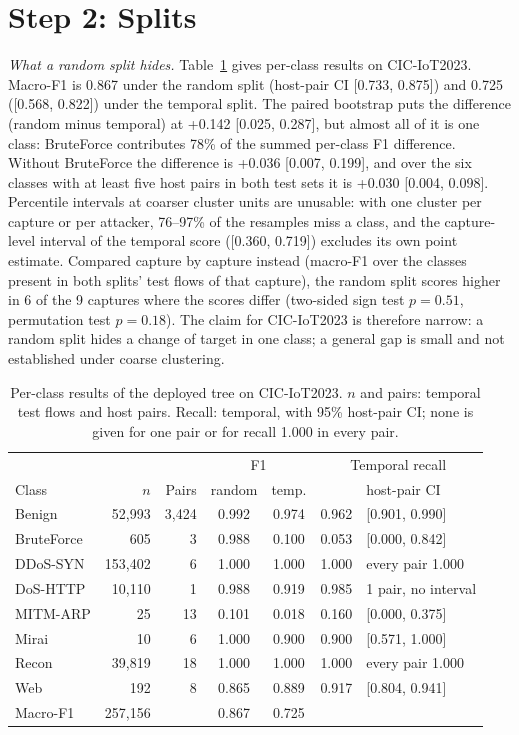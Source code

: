 \section{Step 2: Splits}\label{sec:splits}

\emph{What a random split hides.} Table~\ref{tab:perclass} gives per-class results on CIC-IoT2023. Macro-F1 is 0.867 under the random split (host-pair CI [0.733, 0.875]) and 0.725 ([0.568, 0.822]) under the temporal split. The paired bootstrap puts the difference (random minus temporal) at +0.142 [0.025, 0.287], but almost all of it is one class: BruteForce contributes 78\% of the summed per-class F1 difference. Without BruteForce the difference is +0.036 [0.007, 0.199], and over the six classes with at least five host pairs in both test sets it is +0.030 [0.004, 0.098]. Percentile intervals at coarser cluster units are unusable: with one cluster per capture or per attacker, 76--97\% of the resamples miss a class, and the capture-level interval of the temporal score ([0.360, 0.719]) excludes its own point estimate. Compared capture by capture instead (macro-F1 over the classes present in both splits' test flows of that capture), the random split scores higher in 6 of the 9 captures where the scores differ (two-sided sign test $p=0.51$, permutation test $p=0.18$). The claim for CIC-IoT2023 is therefore narrow: a random split hides a change of target in one class; a general gap is small and not established under coarse clustering.

\begin{table}[t]
\centering
\caption{Per-class results of the deployed tree on CIC-IoT2023. $n$ and pairs: temporal test flows and host pairs. Recall: temporal, with 95\% host-pair CI; none is given for one pair or for recall 1.000 in every pair.}
\label{tab:perclass}
\footnotesize
\setlength{\tabcolsep}{3pt}
\begin{tabular}{lrrcccl}
\hline
 & & & \multicolumn{2}{c}{F1} & \multicolumn{2}{c}{Temporal recall} \\
Class & $n$ & Pairs & random & temp. & & host-pair CI \\
\hline
Benign     &  52,993 & 3,424 & 0.992 & 0.974 & 0.962 & [0.901, 0.990] \\
BruteForce &     605 &     3 & 0.988 & 0.100 & 0.053 & [0.000, 0.842] \\
DDoS-SYN   & 153,402 &     6 & 1.000 & 1.000 & 1.000 & every pair 1.000 \\
DoS-HTTP   &  10,110 &     1 & 0.988 & 0.919 & 0.985 & 1 pair, no interval \\
MITM-ARP   &      25 &    13 & 0.101 & 0.018 & 0.160 & [0.000, 0.375] \\
Mirai      &      10 &     6 & 1.000 & 0.900 & 0.900 & [0.571, 1.000] \\
Recon      &  39,819 &    18 & 1.000 & 1.000 & 1.000 & every pair 1.000 \\
Web        &     192 &     8 & 0.865 & 0.889 & 0.917 & [0.804, 0.941] \\
\hline
Macro-F1   & 257,156 &       & 0.867 & 0.725 & & \\
\hline
\end{tabular}
\end{table}

